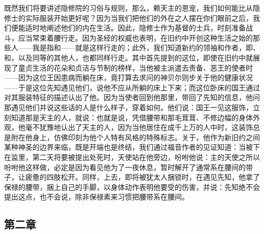 既然我们将要讲述隐修院的习俗与规则，那么，赖天主的恩宠，我们如何能比从隐修士的实际服装开始更好呢？因为当我们把他们的外在之人摆在你们眼前之后，我们便能适时地阐述他们的内在生活。因此，隐修士作为基督的士兵，时刻准备战斗，应当常束着腰行走。因为圣经的权威也表明，在旧约中开创这种生活之始的那些人——我是指和——就是这样行走的；此外，我们知道新约的领袖和作者，即、和，以及同等的其他人，也都同样行走。其中首先提到的这位，即使在旧约中就展现了童贞生活的花朵和贞洁与节制的榜样，当他被主派遣去责备、恶王的使者时——因为这位王因患病而躺在床，竟打算去求问的神贝尔则步关于他的健康状况——于是这位先知遇见他们，说他不应从所躺的床上下来；而这位卧床的国王通过对其服装特征的描述认出了他。因为当使者回到他那里，带回了先知的信息，他问那遇见他们并说这些话的人是什么样子，穿着如何。他们说：国王一见这服饰，立刻知道那是天主的人，就说：也就是说，凭借腰带和那毛茸茸、不修边幅的身体外观，他毫不犹豫地认出了天主的人，因为当他居住在成千上万的人中时，这装饰总是附在他身上，仿佛印刻为他个人特有风格的特殊标志。关于，他作为新旧约之间某种神圣的边界来临，既是开端也是终结，我们通过福音作者的见证知道：当被下在监里，第二天将要被提出处死时，天使站在他旁边，吩咐他说：主的天使之所以吩咐他这样做，必定是因为看见他为了一夜休息，暂时解开了通常系在腰间的带子，让疲惫的四肢松开。同样，上去，即将被犹太人捆锁时，在遇见先知，他拿了保禄的腰带，捆上自己的手脚，以身体动作表明他要受的伤害，并说：先知绝不会提出这点，也不会说，除非保禄素来习惯把腰带系在腰间。\par


\subsection{第二章}

\par

